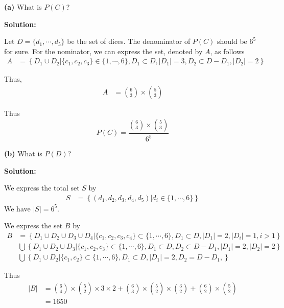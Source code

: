 \documentclass[11pt]{article}
\renewcommand\part[1]{\vspace{.10in}\textbf{(#1)}}
\newcommand{\solution}{\vspace{.10in}\textbf{Solution: }}
\begin{document}
\part{a} What is $P(C)$?

\solution

Let $D=\{d_1,\cdots,d_5\}$ be the set of dices.
The denominator of $P(C)$ should be $6^5$ for sure.
For the nominator, we can express the set, denoted by $A$, as follows
\begin{align*}
  A &= \left\{ D_{1} \cup D_{2} | \{c_1,c_2,c_3\}\in \{1,\cdots, 6\}, D_1\subset D, |D_1| = 3, D_2 \subset D-D_1, |D_2| = 2 \right\}
\end{align*}

Thus,
\begin{align*}
    A &= \binom{6}{3}\times \binom{5}{3}
\end{align*}

Thus
\begin{equation*}
  P(C) = \frac{\binom{6}{3}\times \binom{5}{3}}{6^5}
\end{equation*}

\part{b} What is $P(D)$?

\solution

We express the total set $S$ by
\begin{align*}
  S &= \left\{(d_1,d_2,d_3,d_4,d_5)| d_i\in \{1,\cdots, 6\}\right\}
\end{align*}
We have $|S| = 6^5$.

We express the set $B$ by
\begin{align*}
  B &= \left\{D_1\cup D_2 \cup D_3 \cup D_4 | \{c_1,c_2,c_3,c_4\}\subset \{1,\cdots, 6\}, D_1\subset D, |D_1|=2, |D_i| = 1, i > 1 \right\}\\
    &\bigcup \left\{D_1\cup D_2 \cup D_3| \{c_1,c_2,c_3\}\subset \{1,\cdots, 6\}, D_1\subset D, D_2\subset D-D_1, |D_1| = 2, |D_2| = 2 \right\}\\
    &\bigcup \left\{D_1\cup D_2| \{c_1,c_2\}\subset \{1,\cdots, 6\}, D_1\subset D, |D_1| = 2, D_2=D-D_1, \right\}
\end{align*}

Thus 
\begin{align*}
  |B| &= \binom{6}{4}\times \binom{5}{2}\times 3\times 2 + \binom{6}{3}\times \binom{5}{2}\times \binom{3}{2} + \binom{6}{2}\times \binom{5}{2}  \\
      &= 1650
\end{align*}
\end{document}
